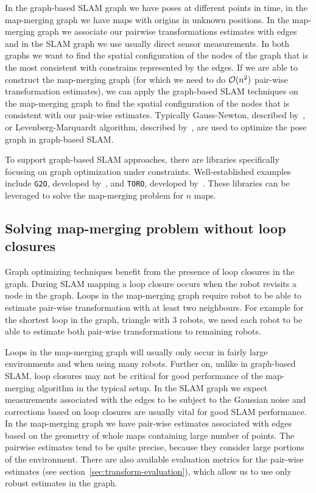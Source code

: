 In the graph-based \gls{SLAM} graph we have poses at different points in time, in the map-merging graph we have maps with origins in unknown positions. In the map-merging graph we associate our pairwise transformations estimates with edges and in the \gls{SLAM} graph we use usually direct sensor measurements. In both graphs we want to find the spatial configuration of the nodes of the graph that is the most consistent with constrains represented by the edges. If we are able to construct the map-merging graph (for which we need to do $\operatorname{\mathcal{O}}(n^2)$ pair-wise transformation estimates), we can apply the graph-based \gls{SLAM} techniques on the map-merging graph to find the spatial configuration of the nodes that is consistent with our pair-wise estimates. Typically Gauss-Newton, described by~\citet{fletcher2013practical}, or Levenberg-Marquardt algorithm, described by~\citet{more1978levmarq}, are used to optimize the pose graph in graph-based \gls{SLAM}.

To support graph-based \gls{SLAM} approaches, there are libraries specifically focusing on graph optimization under constraints. Well-established examples include \texttt{G2O}, developed by~\citet{kummerle2011g2o}, and \texttt{TORO}, developed by~\citet{grisetti2007toro}. These libraries can be leveraged to solve the map-merging problem for $n$ maps.

\subsection{Solving map-merging problem without loop closures}

Graph optimizing techniques benefit from the presence of loop closures in the graph. During \gls{SLAM} mapping a loop closure occurs when the robot revisits a node in the graph. Loops in the map-merging graph require robot to be able to estimate pair-wise transformation with at least two neighbours. For example for the shortest loop in the graph, triangle with $3$ robots, we need each robot to be able to estimate both pair-wise transformations to remaining robots.

Loops in the map-merging graph will usually only occur in fairly large environments and when using many robots. Further on, unlike in graph-based \gls{SLAM}, loop closures may not be critical for good performance of the map-merging algorithm in the typical setup. In the \gls{SLAM} graph we expect measurements associated with the edges to be subject to the Gaussian noise and corrections based on loop closures are usually vital for good \gls{SLAM} performance. In the map-merging graph we have pair-wise estimates associated with edges based on the geometry of whole maps containing large number of points. The pairwise estimates tend to be quite precise, because they consider large portions of the environment. There are also available evaluation metrics for the pair-wise estimates (see section~\ref{sec:transform-evaluation}), which allow us to use only robust estimates in the graph.

